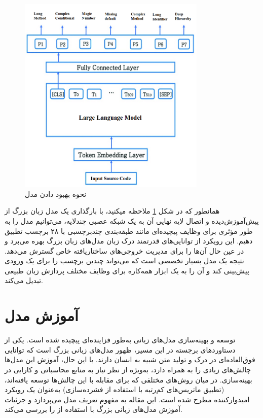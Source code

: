 \begin{figure}[H]
	\centering
	\includegraphics[width=0.8\textwidth]{figures/finetune.png}
	\caption{نحوه بهبود دادن مدل}
	\label{fig:finetune}
\end{figure}
\clearpage
همانطور که در شکل \ref{fig:finetune} ملاحظه میکنید،
با بارگذاری یک مدل زبان بزرگ از پیش‌آموزش‌دیده و اتصال لایه نهایی آن به یک شبکه عصبی چندلایه، می‌توانیم مدل را به طور مؤثری برای وظایف پیچیده‌ای مانند طبقه‌بندی چند‌برچسبی با ۲۸ برچسب تطبیق دهیم. این رویکرد از توانایی‌های قدرتمند درک زبان مدل‌های زبان بزرگ بهره می‌برد و در عین حال آن‌ها را برای مدیریت خروجی‌های ساختاریافته خاص گسترش می‌دهد. نتیجه یک مدل بسیار تخصصی است که می‌تواند چندین برچسب را برای یک ورودی پیش‌بینی کند و آن را به یک ابزار همه‌کاره برای وظایف مختلف پردازش زبان طبیعی تبدیل می‌کند.\cite{j2024finetuningllmenterprise}

\section{آموزش مدل}

توسعه و بهینه‌سازی مدل‌های زبانی به‌طور فزاینده‌ای پیچیده شده است. یکی از دستاوردهای برجسته در این مسیر، ظهور مدل‌های زبانی بزرگ  است که توانایی فوق‌العاده‌ای در درک و تولید متن شبیه به انسان دارند. با این حال، آموزش این مدل‌ها چالش‌های زیادی را به همراه دارد، به‌ویژه از نظر نیاز به منابع محاسباتی و کارایی در بهینه‌سازی. در میان روش‌های مختلفی که برای مقابله با این چالش‌ها توسعه یافته‌اند، (تطبیق ماتریس‌های کم‌رتبه با استفاده از فشرده‌سازی) به‌عنوان یک رویکرد امیدوارکننده مطرح شده است. این مقاله به مفهوم تعریف مدل می‌پردازد و جزئیات آموزش مدل‌های زبانی بزرگ با استفاده از  را بررسی می‌کند.

